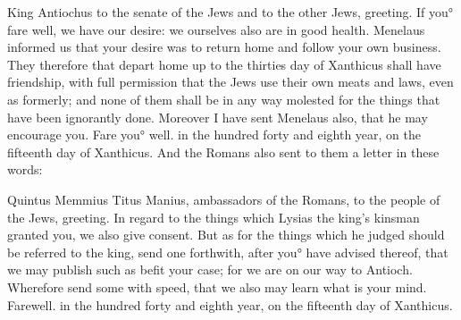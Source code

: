 {\par }{\PP King Antiochus to the senate of the Jews and to the other Jews, greeting.
If you° fare well, we have our desire: we ourselves also are in good health.
Menelaus informed us that your desire was to return home and follow your own business.
They therefore that depart home up to the thirties day of Xanthicus shall have
{}
 friendship, with full permission
that the Jews use their own
{} meats and
{} laws, even as formerly; and none of them shall be in any way molested for the things that have been ignorantly done.
Moreover I have sent Menelaus also, that he may encourage you.
Fare you° well.
{} in the hundred forty and eighth year, on the fifteenth day of Xanthicus.
And the Romans also sent to them a letter in these words:
\par }{\PP Quintus Memmius
{} Titus Manius, ambassadors of the Romans, to the people of the Jews, greeting.
In regard to the things which Lysias the king’s kinsman granted you, we also give consent.
But as for the things which he judged should be referred to the king, send one forthwith, after you° have advised thereof, that we may publish such
{} as befit your case; for we are on our way to Antioch.
Wherefore send some with speed, that we also may learn what is your mind.
 Farewell.
{} in the hundred forty and eighth year, on the fifteenth day of Xanthicus.

}
